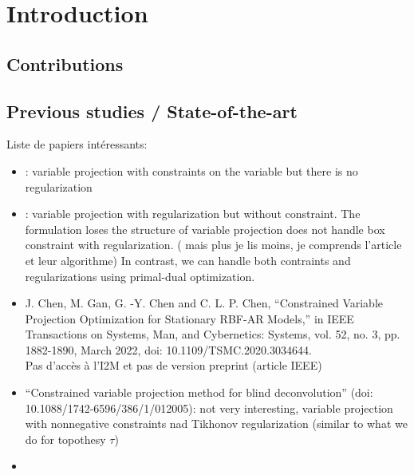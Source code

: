 \section{Introduction}


\subsection{Contributions}


\subsection{Previous studies / State-of-the-art}
\label{ssec:prev_stud}


Liste de papiers intéressants:
\begin{itemize}
\item \cite{OLeary_D_2012_j-comput-optim-appl_variable_pnlsp}: variable projection
  with constraints on the variable but there is no regularization
\item \cite{Leeuwen_T_2021_j-siam-j-sci-comput_variable_pnp}: variable projection
  with regularization but without constraint.
  The formulation loses the structure of variable projection does not handle box
  constraint with regularization.
  ({\color{red} mais plus je lis moins, je comprends l'article et leur algorithme)}
  In contrast, we can handle both contraints and regularizations using
  primal-dual optimization.
\item J. Chen, M. Gan, G. -Y. Chen and C. L. P. Chen, ``Constrained Variable Projection Optimization for Stationary RBF-AR Models,'' in IEEE Transactions on Systems, Man, and Cybernetics: Systems, vol. 52, no. 3, pp. 1882-1890, March 2022, doi: 10.1109/TSMC.2020.3034644. \\
  Pas d'accès à l'I2M et pas de version preprint (article IEEE)
\item ``Constrained variable projection method for blind deconvolution''
  (doi: 10.1088/1742-6596/386/1/012005): not very interesting, variable
  projection with nonnegative constraints nad Tikhonov regularization
  (similar to what we do for topothesy $\tau$)
\item {}
\end{itemize}


